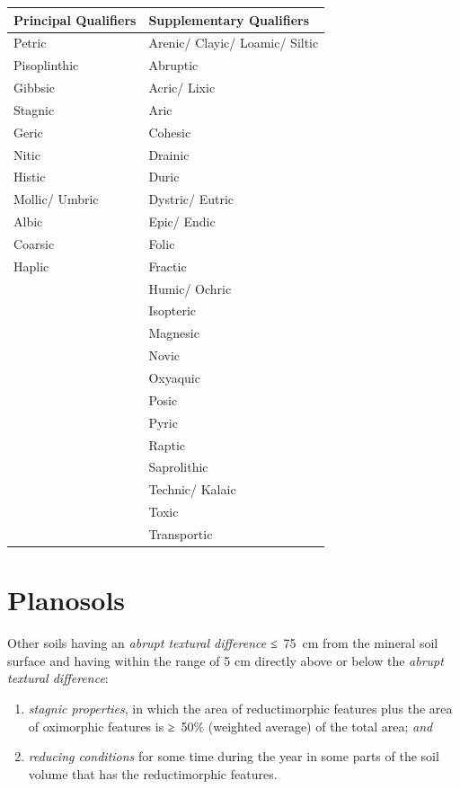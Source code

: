 \documentclass[
  letterpaper,
  DIV=11,
  numbers=noendperiod]{scrreprt}
\providecommand{\tightlist}{%
  \setlength{\itemsep}{0pt}\setlength{\parskip}{0pt}}\usepackage{longtable,booktabs,array}
\begin{document}
\begin{longtable}[]{@{}ll@{}}
\toprule()
Principal Qualifiers & Supplementary Qualifiers \\
\midrule()
\endhead
Petric & Arenic/ Clayic/ Loamic/ Siltic \\
Pisoplinthic & Abruptic \\
Gibbsic & Acric/ Lixic \\
Stagnic & Aric \\
Geric & Cohesic \\
Nitic & Drainic \\
Histic & Duric \\
Mollic/ Umbric & Dystric/ Eutric \\
Albic & Epic/ Endic \\
Coarsic & Folic \\
Haplic & Fractic \\
& Humic/ Ochric \\
& Isopteric \\
& Magnesic \\
& Novic \\
& Oxyaquic \\
& Posic \\
& Pyric \\
& Raptic \\
& Saprolithic \\
& Technic/ Kalaic \\
& Toxic \\
& Transportic \\
\bottomrule()
\end{longtable}


\hypertarget{key-planosols}{%
\chapter{Planosols}\label{key-planosols}}

Other soils having an \emph{abrupt textural difference} ≤~75~cm from the
mineral soil surface and having within the range of 5 cm directly above
or below the \emph{abrupt textural difference}:

\begin{enumerate}
\def\labelenumi{\arabic{enumi}.}
\tightlist
\item
  \emph{stagnic properties}, in which the area of reductimorphic
  features plus the area of oximorphic features is ≥~50\% (weighted
  average) of the total area; \emph{and}
\item
  \emph{reducing conditions} for some time during the year in some parts
  of the soil volume that has the reductimorphic features.
\end{enumerate}
\end{document}
